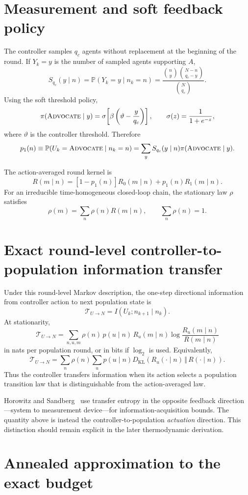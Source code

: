 \documentclass[11pt]{article}
\newcommand{\Adv}{\textsc{Advocate}}
\newcommand{\Prob}{\mathbb{P}}
\newcommand{\KL}{D_{\mathrm{KL}}}
\begin{document}
\section{Measurement and soft feedback policy}

The controller samples $q_c$ agents without replacement at the beginning of the
round. If $Y_k=y$ is the number of sampled agents supporting $A$,
\[
S_{q_c}(y\mid n)
=
\Prob(Y_k=y\mid n_k=n)
=
\frac{\binom{n}{y}\binom{N-n}{q_c-y}}
     {\binom{N}{q_c}}.
\]
Using the soft threshold policy,
\[
\pi(\Adv\mid y)
=
\sigma\!\left[
\beta\left(\vartheta-\frac{y}{q_c}\right)
\right],
\qquad
\sigma(z)=\frac{1}{1+e^{-z}},
\]
where $\vartheta$ is the controller threshold. Therefore
\[
p_1(n)
\equiv
\Prob(U_k=\Adv\mid n_k=n)
=
\sum_y S_{q_c}(y\mid n)\pi(\Adv\mid y).
\]

The action-averaged round kernel is
\[
R(m\mid n)
=
[1-p_1(n)]R_0(m\mid n)+p_1(n)R_1(m\mid n).
\]
For an irreducible time-homogeneous closed-loop chain, the stationary law
$\rho$ satisfies
\[
\rho(m)=\sum_n \rho(n)R(m\mid n),
\qquad
\sum_n\rho(n)=1.
\]

\section{Exact round-level controller-to-population information transfer}

Under this round-level Markov description, the one-step directional information
from controller action to next population state is
\[
\mathcal{T}_{U\to N}
=
I(U_k;n_{k+1}\mid n_k).
\]
At stationarity,
\[
\boxed{
\mathcal{T}_{U\to N}
=
\sum_{n,u,m}
\rho(n)\,p(u\mid n)\,R_u(m\mid n)
\log
\frac{R_u(m\mid n)}
     {R(m\mid n)}
}
\]
in nats per population round, or in bits if $\log_2$ is used. Equivalently,
\[
\mathcal{T}_{U\to N}
=
\sum_n \rho(n)
\sum_u p(u\mid n)
\KL\!\left(
R_u(\cdot\mid n)\,\Vert\,R(\cdot\mid n)
\right).
\]
Thus the controller transfers information when its action selects a population
transition law that is distinguishable from the action-averaged law.

Horowitz and Sandberg~\cite{horowitz2014} use transfer entropy in the opposite
feedback direction---system to measurement device---for information-acquisition
bounds. The quantity above is instead the controller-to-population
\emph{actuation} direction. This distinction should remain explicit in the later
thermodynamic derivation.

\section{Annealed approximation to the exact budget}
\end{document}
